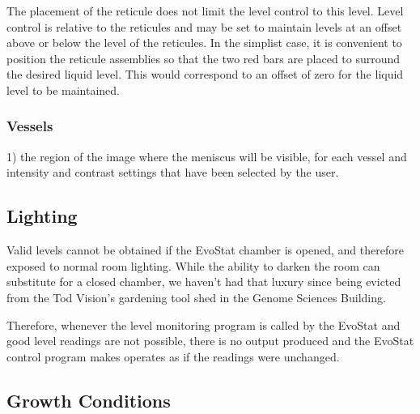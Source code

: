 \documentclass[10pt,letterpaper]{article}
\begin{document}
The placement of the reticule does not limit the level control to this level. Level control is relative to the reticules and may be set to maintain levels at an offset above or below the level of the reticules. In the simplist case, it is convenient to position the reticule assemblies so that the two red bars are placed to surround the desired liquid level.  This would correspond to an offset of zero for the liquid level to be maintained.



\subsubsection*{Vessels}
1) the region of the image where the meniscus will be visible, for each vessel and intensity and contrast settings that have been selected by the user.

\subsection*{Lighting}
Valid levels cannot be obtained if the EvoStat chamber is opened, and therefore exposed to normal room lighting.  While the ability to darken the room can substitute for a closed chamber, we haven't had that luxury since being evicted from the Tod Vision's gardening tool shed in the Genome Sciences Building.

Therefore, whenever the level monitoring program is called by the EvoStat and good level readings are not possible, there is no output produced and the EvoStat control program makes operates as if the readings were unchanged.


\subsection*{Growth Conditions}


{}

\end{document}
